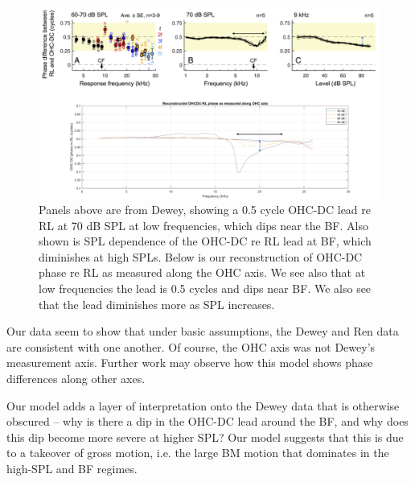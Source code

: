 \documentclass{article}
\begin{document}
\begin{figure}
	\centering
	\includegraphics[width=\textwidth]{Figures/reconstructeddewey.png}
	\caption{Panels above are from Dewey, showing a 0.5 cycle OHC-DC lead re RL at 70 dB SPL at low frequencies, which dips near the BF. Also shown is SPL dependence of the OHC-DC re RL lead at BF, which diminishes at high SPLs. Below is our reconstruction of OHC-DC phase re RL as measured along the OHC axis. We see also that at low frequencies the lead is 0.5 cycles and dips near BF. We also see that the lead diminishes more as SPL increases.} 
	\label{reconstructeddewey}
\end{figure}

\par{Our data seem to show that under basic assumptions, the Dewey and Ren data are consistent with one another. Of course, the OHC axis was not Dewey's measurement axis. Further work may observe how this model shows phase differences along other axes.}
\par{Our model adds a layer of interpretation onto the Dewey data that is otherwise obscured -- why is there a dip in the OHC-DC lead around the BF, and why does this dip become more severe at higher SPL? Our model suggests that this is due to a takeover of gross motion, i.e. the large BM motion that dominates in the high-SPL and BF regimes.}
\end{document}
